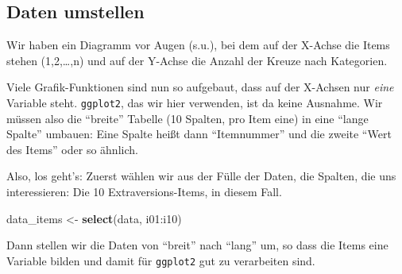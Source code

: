 \documentclass[12pt,]{book}
\makeatletter
\newenvironment{Shaded}{\begin{snugshade}}{\end{snugshade}}
\newcommand{\KeywordTok}[1]{\textcolor[rgb]{0.13,0.29,0.53}{\textbf{{#1}}}}
\newcommand{\DataTypeTok}[1]{\textcolor[rgb]{0.13,0.29,0.53}{{#1}}}
\newcommand{\StringTok}[1]{\textcolor[rgb]{0.31,0.60,0.02}{{#1}}}
\newcommand{\CommentTok}[1]{\textcolor[rgb]{0.56,0.35,0.01}{\textit{{#1}}}}
\newcommand{\NormalTok}[1]{{#1}}
\newenvironment{kframe}{%
\medskip{}
\setlength{\fboxsep}{.8em}
 \def\at@end@of@kframe{}%
 \ifinner\ifhmode%
  \def\at@end@of@kframe{\end{minipage}}%
  \begin{minipage}{\columnwidth}%
 \fi\fi%
 \def\FrameCommand##1{\hskip\@totalleftmargin \hskip-\fboxsep
 \colorbox{shadecolor}{##1}\hskip-\fboxsep
     \hskip-\linewidth \hskip-\@totalleftmargin \hskip\columnwidth}%
 \MakeFramed {\advance\hsize-\width
   \@totalleftmargin\z@ \linewidth\hsize
   \@setminipage}}%
 {\par\unskip\endMakeFramed%
 \at@end@of@kframe}
\renewenvironment{Shaded}{\begin{kframe}}{\end{kframe}}
\makeatother
\begin{document}
\begin{Shaded}
\end{Shaded}

\subsection{Daten umstellen}\label{daten-umstellen}

Wir haben ein Diagramm vor Augen (s.u.), bei dem auf der X-Achse die
Items stehen (1,2,\ldots{},n) und auf der Y-Achse die Anzahl der Kreuze
nach Kategorien.

Viele Grafik-Funktionen sind nun so aufgebaut, dass auf der X-Achsen nur
\emph{eine} Variable steht. \texttt{ggplot2}, das wir hier verwenden,
ist da keine Ausnahme. Wir müssen also die ``breite'' Tabelle (10
Spalten, pro Item eine) in eine ``lange Spalte'' umbauen: Eine Spalte
heißt dann ``Itemnummer'' und die zweite ``Wert des Items'' oder so
ähnlich.

Also, los geht's: Zuerst wählen wir aus der Fülle der Daten, die
Spalten, die uns interessieren: Die 10 Extraversions-Items, in diesem
Fall.

\begin{Shaded}
\begin{Highlighting}[]
\NormalTok{data_items <-}\StringTok{ }\KeywordTok{select}\NormalTok{(data, i01:i10)}
\end{Highlighting}
\end{Shaded}

Dann stellen wir die Daten von ``breit'' nach ``lang'' um, so dass die
Items eine Variable bilden und damit für \texttt{ggplot2} gut zu
verarbeiten sind.

\begin{Shaded}
\end{Shaded}
\end{document}

